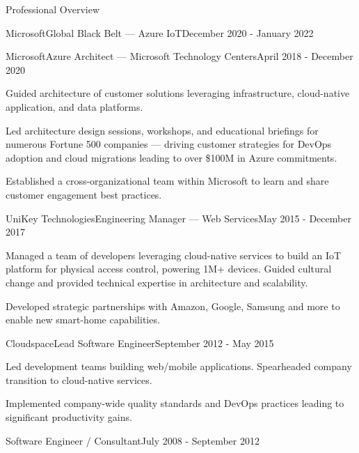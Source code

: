 \documentclass{resume} %
\begin{document}
\begin{rSection}{Professional Overview}
\begin{rNewRole}{Microsoft}{Global Black Belt --- Azure IoT}{December 2020 - January 2022}
  \end{rNewRole}

  \begin{rNewRole}{Microsoft}{Azure Architect --- Microsoft Technology Centers}{April 2018 - December 2020}
      
    \item Guided architecture of customer solutions leveraging infrastructure, cloud-native application, and data platforms.
    \item Led architecture design sessions, workshops, and educational briefings for numerous Fortune 500 companies --- driving customer strategies for DevOps adoption and cloud migrations leading to over \$100M in Azure commitments.
    \item Established a cross-organizational team within Microsoft to learn and share customer engagement best practices.
    
  \end{rNewRole}
  
  
  \begin{rNewRole}{UniKey Technologies}{Engineering Manager --- Web Services}{May 2015 - December 2017}
    
    \item Managed a team of developers leveraging cloud-native services to build an IoT platform for physical access control, powering 1M+ devices.  Guided cultural change and provided technical expertise in architecture and scalability.
    \item Developed strategic partnerships with Amazon, Google, Samsung and more to enable new smart-home capabilities.
    
  \end{rNewRole}
  
  
  \begin{rNewRole}{Cloudspace}{Lead Software Engineer}{September 2012 - May 2015}
    
    \item Led development teams building web/mobile applications. Spearheaded company transition to cloud-native services.
    \item Implemented company-wide quality standards and DevOps practices leading to significant productivity gains.
    
  \end{rNewRole}
  
  
  \begin{rCompany}{Software Engineer / Consultant}{July 2008 - September 2012}{}

  \end{rCompany}
  
  
  
\end{rSection}
\end{document}
